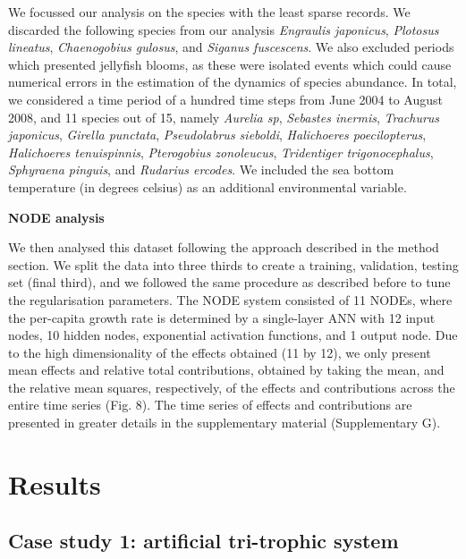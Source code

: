 \documentclass[11pt, oneside]{article}
\begin{document}
We focussed our analysis on the species with the least sparse records.
We discarded the following species from our analysis \textit{Engraulis japonicus}, \textit{Plotosus lineatus}, \textit{Chaenogobius gulosus}, and \textit{Siganus fuscescens}.
We also excluded periods which presented jellyfish blooms, as these were isolated events which could cause numerical errors in the estimation of the dynamics of species abundance.
In total, we considered a time period of a hundred time steps from June 2004 to August 2008, and 11 species out of 15, namely \textit{Aurelia sp}, \textit{Sebastes inermis}, \textit{Trachurus japonicus}, \textit{Girella punctata}, \textit{Pseudolabrus sieboldi}, \textit{Halichoeres poecilopterus}, \textit{Halichoeres tenuispinnis}, \textit{Pterogobius zonoleucus}, \textit{Tridentiger trigonocephalus}, \textit{Sphyraena pinguis}, and \textit{Rudarius ercodes}.
We included the sea bottom temperature (in degrees celsius) as an additional environmental variable.

\textbf{NODE analysis}

We then analysed this dataset following the approach described in the method section. 
We split the data into three thirds to create a training, validation, testing set (final third), and we followed the same procedure as described before to tune the regularisation parameters.
The NODE system consisted of 11 NODEs, where the per-capita growth rate is determined by a single-layer ANN with 12 input nodes, 10 hidden nodes, exponential activation functions, and 1 output node.
Due to the high dimensionality of the effects obtained (11 by 12), we only present mean effects and relative total contributions, obtained by taking the mean, and the relative mean squares, respectively, of the effects and contributions across the entire time series (Fig. 8).
The time series of effects and contributions are presented in greater details in the supplementary material (Supplementary G).

\section{Results}

\subsection{Case study 1: artificial tri-trophic system}
\end{document}
